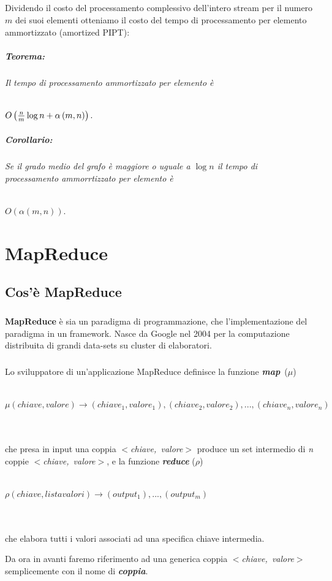 \documentclass[a4paper,11pt]{report}
\begin{document}
\paragraph{}
Dividendo il costo del processamento complessivo dell'intero stream per il numero $m$ dei suoi elementi otteniamo il costo del tempo di
processamento per elemento ammortizzato 
(amortized PIPT):
\paragraph{Teorema:}\emph{Il tempo di processamento ammortizzato per elemento è} \\\\
\centerline{$O\left({n\over{m}}\log n+\alpha\left(m,n\right)\right).$}
\paragraph{Corollario:}\emph{Se il grado medio del grafo è maggiore o uguale a $\log n$ il tempo di processamento ammorrtizzato per elemento
è}\\\\
\centerline{$O\left(\alpha\left(m,n\right)\right).$} 



\chapter{MapReduce}
\section{Cos'è MapReduce}\label{MapReduce}
\paragraph{} \textbf{MapReduce} è sia un paradigma di programmazione, che l'implementazione del paradigma in un framework. Nasce da Google
nel 2004 per 
la computazione distribuita di grandi data-sets su cluster di elaboratori.
\paragraph{}
Lo sviluppatore di un'applicazione MapReduce definisce la funzione \mbox{\emph{\textbf{map}} ($\mu$)}\\\\ \centerline{$\mu(chiave,valore)
\rightarrow (chiave_1,valore_1),
(chiave_2,valore_2),...,(chiave_n,valore_n)$}\\\\che presa in input una coppia \emph{\mbox{$<$chiave, valore$>$}}
produce un set intermedio di \emph{n} coppie \emph{\mbox{$<$chiave, valore$>$}}, e la funzione \emph{\textbf{reduce}} ($\rho$) \\\\
\centerline{$\rho (chiave, lista valori) \rightarrow (output_1), ..., (output_m)$ }\\\\
che elabora
tutti i valori associati ad una specifica chiave intermedia.
\par
Da ora in avanti faremo riferimento ad una generica coppia  \emph{\mbox{$<$chiave, valore$>$}} semplicemente con il nome di \emph
{\textbf{coppia}}.
\end{document}
